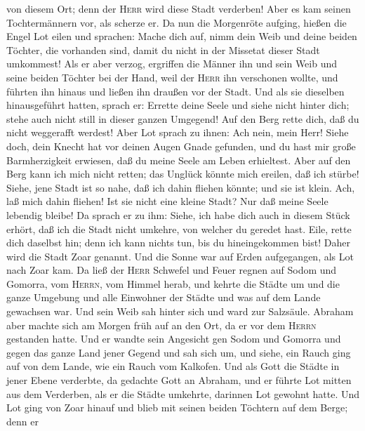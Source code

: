 von diesem Ort; denn der \textsc{Herr} wird diese Stadt verderben! Aber
es kam seinen Tochtermännern vor, als scherze er.  Da nun
die Morgenröte aufging, hießen die Engel Lot eilen und sprachen: Mache
dich auf, nimm dein Weib und deine beiden Töchter, die vorhanden sind,
damit du nicht in der Missetat dieser Stadt umkommest! 
Als er aber verzog, ergriffen die Männer ihn und sein Weib und seine
beiden Töchter bei der Hand, weil der \textsc{Herr} ihn verschonen
wollte, und führten ihn hinaus und ließen ihn draußen vor der Stadt.
 Und als sie dieselben hinausgeführt hatten, sprach er:
Errette deine Seele und siehe nicht hinter dich; stehe auch nicht still
in dieser ganzen Umgegend! Auf den Berg rette dich, daß du nicht
weggerafft werdest!  Aber Lot sprach zu ihnen: Ach nein,
mein Herr!  Siehe doch, dein Knecht hat vor deinen Augen
Gnade gefunden, und du hast mir große Barmherzigkeit erwiesen, daß du
meine Seele am Leben erhieltest. Aber auf den Berg kann ich mich nicht
retten; das Unglück könnte mich ereilen, daß ich stürbe! 
Siehe, jene Stadt ist so nahe, daß ich dahin fliehen könnte; und sie ist
klein. Ach, laß mich dahin fliehen! Ist sie nicht eine kleine Stadt? Nur
daß meine Seele lebendig bleibe!  Da sprach er zu ihm:
Siehe, ich habe dich auch in diesem Stück erhört, daß ich die Stadt
nicht umkehre, von welcher du geredet hast.  Eile, rette
dich daselbst hin; denn ich kann nichts tun, bis du hineingekommen bist!
Daher wird die Stadt Zoar genannt.  Und die Sonne war auf
Erden aufgegangen, als Lot nach Zoar kam.  Da ließ der
\textsc{Herr} Schwefel und Feuer regnen auf Sodom und Gomorra, vom
\textsc{Herrn}, vom Himmel herab,  und kehrte die Städte
um und die ganze Umgebung und alle Einwohner der Städte und was auf dem
Lande gewachsen war.  Und sein Weib sah hinter sich und
ward zur Salzsäule.  Abraham aber machte sich am Morgen
früh auf an den Ort, da er vor dem \textsc{Herrn} gestanden hatte.
 Und er wandte sein Angesicht gen Sodom und Gomorra und
gegen das ganze Land jener Gegend und sah sich um, und siehe, ein Rauch
ging auf von dem Lande, wie ein Rauch vom Kalkofen.  Und
als Gott die Städte in jener Ebene verderbte, da gedachte Gott an
Abraham, und er führte Lot mitten aus dem Verderben, als er die Städte
umkehrte, darinnen Lot gewohnt hatte.  Und Lot ging von
Zoar hinauf und blieb mit seinen beiden Töchtern auf dem Berge; denn er
